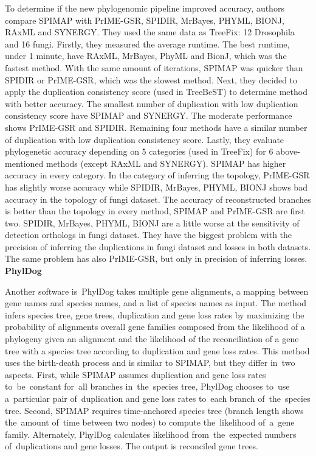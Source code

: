 To determine if the new phylogenomic pipeline improved accuracy, authors compare SPIMAP with PrIME-GSR, SPIDIR, MrBayes, PHYML, BIONJ, RAxML and SYNERGY. They used the same data as TreeFix: 12 Drosophila and 16 fungi. Firstly, they measured the average runtime. The best runtime, under 1 minute, have RAxML, MrBayes, PhyML and BionJ, which was the fastest method. With the same amount of iterations, SPIMAP was quicker than SPIDIR or PrIME-GSR, which was the slowest method. Next, they decided to apply the duplication consistency score (used in TreeBeST) to determine method with better accuracy. The smallest number of duplication with low duplication consistency score have SPIMAP and SYNERGY. The moderate performance shows PrIME-GSR and SPIDIR. Remaining four methods have a similar number of duplication with low duplication consistency score. Lastly, they evaluate phylogenetic accuracy depending on 5 categories (used in TreeFix) for 6 above-mentioned methods (except RAxML and SYNERGY). SPIMAP has higher accuracy in every category. In the category of inferring the topology, PrIME-GSR has slightly worse accuracy while SPIDIR, MrBayes, PHYML, BIONJ shows bad accuracy in the topology of fungi dataset. The accuracy of reconstructed branches is better than the topology in every method, SPIMAP and PrIME-GSR are first two. SPIDIR, MrBayes, PHYML, BIONJ are a little worse at the sensitivity of detection orthologs in fungi dataset. They have the biggest problem with the precision of inferring the duplications in fungi dataset and losses in both datasets. The same problem has also PrIME-GSR, but only in precision of inferring losses.\\
\textbf{PhylDog}

Another software is~PhylDog \cite{phyldog_online} takes multiple gene alignments, a mapping between gene names and species names, and a list of species names as input. The method infers species tree, gene trees, duplication and gene loss rates by maximizing the probability of alignments overall gene families composed from the likelihood of a phylogeny given an alignment and the likelihood of the reconciliation of a gene tree with a species tree according to duplication and gene loss rates. This method uses the birth-death process and is similar to SPIMAP, but they differ in~two aspects. First, while SPIMAP assumes duplication and gene loss rates to~be~constant for~all branches in~the~species tree, PhylDog chooses to~use a~particular pair of~duplication and gene loss rates to~each branch of~the~species tree. Second, SPIMAP requires time-anchored species tree (branch length shows the~amount of~time between two nodes) to compute the~likelihood of~a~gene family. Alternately, PhylDog calculates likelihood from~the~expected numbers of~duplications and gene losses. The output is reconciled gene trees.

